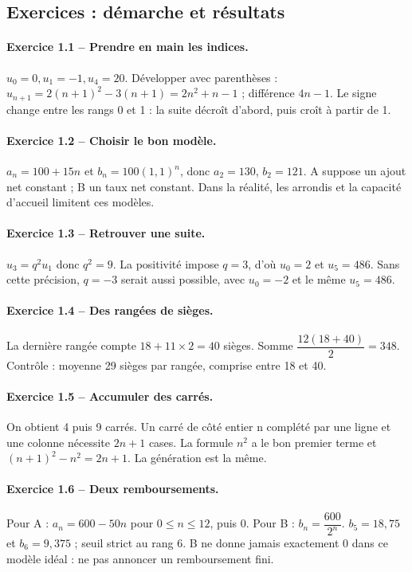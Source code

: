 \subsection*{Exercices : démarche et résultats}
\paragraph{Exercice 1.1 -- Prendre en main les indices.} $u_0=0,u_1=-1,u_4=20$. Développer avec parenthèses : $u_{n+1}=2(n+1)^2-3(n+1)=2n^2+n-1$ ; différence $4n-1$. Le signe change entre les rangs 0 et 1 : la suite décroît d’abord, puis croît à partir de 1.
\paragraph{Exercice 1.2 -- Choisir le bon modèle.} $a_n=100+15n$ et $b_n=100(1{,}1)^n$, donc $a_2=130$, $b_2=121$. A suppose un ajout net constant ; B un taux net constant. Dans la réalité, les arrondis et la capacité d’accueil limitent ces modèles.
\paragraph{Exercice 1.3 -- Retrouver une suite.} $u_3=q^2u_1$ donc $q^2=9$. La positivité impose $q=3$, d’où $u_0=2$ et $u_5=486$. Sans cette précision, $q=-3$ serait aussi possible, avec $u_0=-2$ et le même $u_5=486$.
\paragraph{Exercice 1.4 -- Des rangées de sièges.} La dernière rangée compte $18+11\times2=40$ sièges. Somme $\dfrac{12(18+40)}{2}=348$. Contrôle : moyenne 29 sièges par rangée, comprise entre 18 et 40.
\paragraph{Exercice 1.5 -- Accumuler des carrés.} On obtient 4 puis 9 carrés. Un carré de côté entier n complété par une ligne et une colonne nécessite $2n+1$ cases. La formule $n^2$ a le bon premier terme et $ (n+1)^2-n^2=2n+1$. La génération est la même.
\paragraph{Exercice 1.6 -- Deux remboursements.} Pour A : $a_n=600-50n$ pour $0\leq n\leq12$, puis 0. Pour B : $b_n=\dfrac{600}{2^n}$. $b_5=18{,}75$ et $b_6=9{,}375$ ; seuil strict au rang 6. B ne donne jamais exactement 0 dans ce modèle idéal : ne pas annoncer un remboursement fini.

